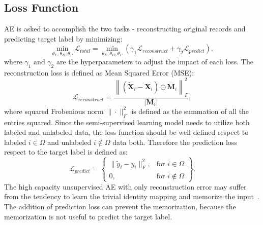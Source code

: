 \subsection{Loss Function}
AE is asked to accomplish the two tasks - reconstructing original records and predicting target label by minimizing:
\begin{equation}\label{eq: objective}
    \min_{\theta_E, \theta_D, \theta_P} \mathcal{L}_{total} = \min_{\theta_E, \theta_D, \theta_P}(\gamma_1\mathcal{L}_{reconstruct} + \gamma_2\mathcal{L}_{predict}),
\end{equation}
where $\gamma_1$ and $\gamma_2$ are the hyperparameters to adjust the impact of each loss.
The reconstruction loss is defined as Mean Squared Error (MSE):
\begin{equation}
    \mathcal{L}_{reconstruct} = \frac{\left\| (\tilde{\mathbf{X}}_i - \mathbf{X}_i) \odot \mathbf{M}_i \right\|_F^2}{|\mathbf{M}_i|},
\end{equation}
where squared Frobenious norm $\| \cdot \|_F^2$ is defined as the summation of all the entries squared. Since the semi-supervised learning model needs to utilize both labeled and unlabeled data, the loss function should be well defined respect to labeled $i \in \Omega$ and unlabeled $i \not\in \Omega$ data both. Therefore the prediction loss respect to the target label is defined as:
\begin{equation}
    \mathcal{L}_{predict} = \left\{\begin{array}{lr}
        \| \tilde{y}_i - y_i \|_F^2, & \text{for } i \in \Omega\\
        0, & \text{for } i \not\in \Omega
    \end{array}\right\}.
\end{equation}
The high capacity unsupervised AE with only reconstruction error may suffer from the tendency to learn the trivial identity mapping and memorize the input~\cite{srivastava2015unsupervised}. The addition of prediction loss can prevent the memorization, because the memorization is not useful to predict the target label. 

